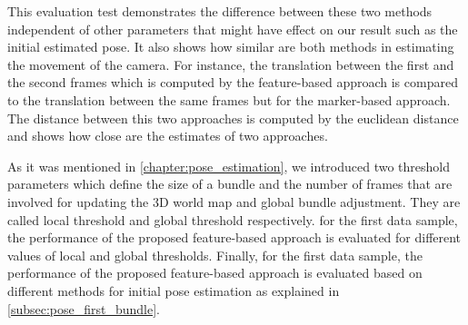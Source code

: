 This evaluation test demonstrates the difference between these two methods independent of other parameters that might have effect on our result such as the initial estimated pose. It also shows how similar are both methods in estimating the movement of the camera. For instance, the translation between the first and the second frames which is computed by the feature-based approach is compared to the translation between the same frames but for the marker-based approach. The distance between this two approaches is computed by the euclidean distance and shows how close are the estimates of two approaches. 

As it was mentioned in \autoref{chapter:pose_estimation}, we introduced two threshold parameters which define the size of a bundle and the number of frames that are involved for updating the 3D world map and global bundle adjustment. They are called local threshold and global threshold respectively. for the first data sample, the performance of the proposed feature-based approach is evaluated for different values of local and global thresholds. Finally, for the first data sample, the performance of the proposed feature-based approach is evaluated based on different methods for initial pose estimation as explained in \autoref{subsec:pose_first_bundle}.

